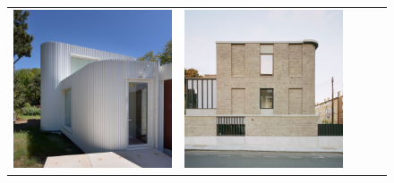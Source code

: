 \begin{figure}[H]
{\begin{tabular}{@{}ccccc@{}}
      \includegraphics[width=\linewidth]{Images/LoRAs/Ghoek/Training_images/8.jpg} &
      \includegraphics[width=\linewidth]{Images/LoRAs/Ghoek/Training_images/9.jpg} &

\end{tabular}}
\end{figure}
